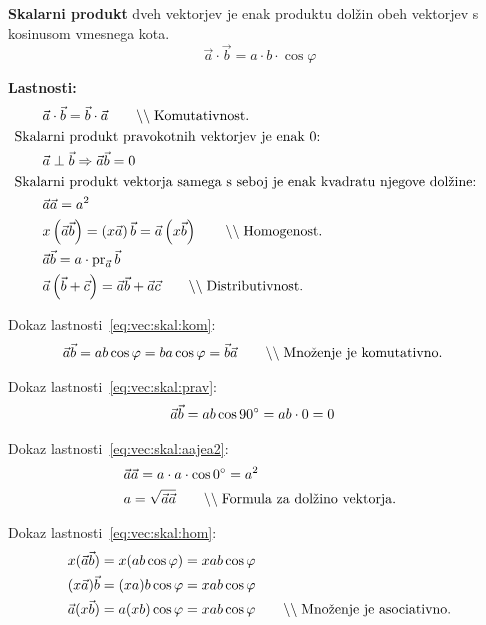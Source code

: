 \documentclass[a4paper,oneside,12pt,fleqn]{article}
\newcommand\krat\cdot
\newcommand{\comment}[1]{\ensuremath{\qquad\backslash\backslash\;}\textnormal{#1}}
\newcommand{\pr}{\ensuremath{\operatorname{pr}}} %
\def\kos{\cos}
\def\deg{\degree}
\renewcommand\implies\Rightarrow
\numberwithin{equation}{section}
\begin{document}
\textbf{Skalarni produkt} dveh vektorjev je enak produktu dolžin obeh vektorjev s
kosinusom vmesnega kota.
\begin{equation}
  \vec{a} \krat \vec{b} = a \krat b \krat \kos\varphi \label{eq:vec:skal:def}
\end{equation}


\textbf{Lastnosti:}
\begin{align}
  &\vec{a} \krat \vec{b} = \vec{b} \krat \vec{a} \comment{Komutativnost.}  \label{eq:vec:skal:kom} \\
  &\hspace{-20pt} \text{Skalarni produkt pravokotnih vektorjev je enak 0:} \nonumber \\
  &\vec{a} \perp \vec{b} \implies \vec{a}\vec{b} = 0 \label{eq:vec:skal:prav} \\
  &\hspace{-20pt} \text{Skalarni produkt vektorja samega s seboj je enak kvadratu njegove dolžine:} \nonumber \\
  &\vec{a}\vec{a} = a^2  \label{eq:vec:skal:aajea2} \\
  &x\left(\vec{a}\vec{b}\right) = \left(x\vec{a}\right)\vec{b} = \vec{a}\left(x\vec{b}\right) \comment{Homogenost.}
  \label{eq:vec:skal:hom} \\
  &\vec{a}\vec{b} =  a \krat \pr_{\vec{a}}\vec{b} \label{eq:vec:skal:proj} \\
  &\vec{a}\left( \vec{b} + \vec{c} \right) =  \vec{a}\vec{b} + \vec{a}\vec{c}
  \comment{Distributivnost.} \label{eq:vec:skal:dist}
\end{align}

Dokaz lastnosti~\ref{eq:vec:skal:kom}:
\begin{align*}
  & \vec{a}\vec{b} = ab\kos\varphi = ba\kos\varphi = \vec{b}\vec{a} \comment{Množenje je
  komutativno.}
\end{align*}

Dokaz lastnosti~\ref{eq:vec:skal:prav}:
\begin{align*}
  &\vec{a}\vec{b} = ab\kos90\deg = ab\krat0 = 0
\end{align*}

Dokaz lastnosti~\ref{eq:vec:skal:aajea2}:
\begin{align*}
  &\vec{a}\vec{a} = a\krat a \krat\kos0\deg = a^2 \\
  &a = \sqrt{\vec{a}\vec{a}} \comment{Formula za dolžino vektorja.}
\end{align*}

Dokaz lastnosti~\ref{eq:vec:skal:hom}:
\begin{align*}
  x(\vec{a}\vec{b}) &=  x(ab\kos\varphi) = xab\kos\varphi \\
  (x\vec{a})\vec{b} &= (xa)b\kos\varphi = xab\kos\varphi \\
  \vec{a}(x\vec{b}) &= a(xb)\kos\varphi = xab\kos\varphi \comment{Množenje je
  asociativno.}
\end{align*}
\end{document}
